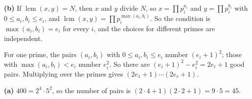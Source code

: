 \textbf{(b)} If $\operatorname{lcm}(x,y)=N$, then $x$ and $y$ divide $N$, so $x=\prod p_i^{a_i}$ and $y=\prod p_i^{b_i}$ with $0\le a_i,b_i\le e_i$, and $\operatorname{lcm}(x,y)=\prod p_i^{\max(a_i,b_i)}$. So the condition is $\max(a_i,b_i)=e_i$ for every $i$, and the choices for different primes are independent.

For one prime, the pairs $(a_i,b_i)$ with $0\le a_i,b_i\le e_i$ number $(e_i+1)^2$; those with $\max(a_i,b_i)<e_i$ number $e_i^2$. So there are $(e_i+1)^2-e_i^2=2e_i+1$ good pairs. Multiplying over the primes gives $(2e_1+1)\cdots(2e_r+1)$.

\textbf{(a)} $400=2^4\cdot5^2$, so the number of pairs is $(2\cdot4+1)(2\cdot2+1)=9\cdot5=\boxed{45}$.
